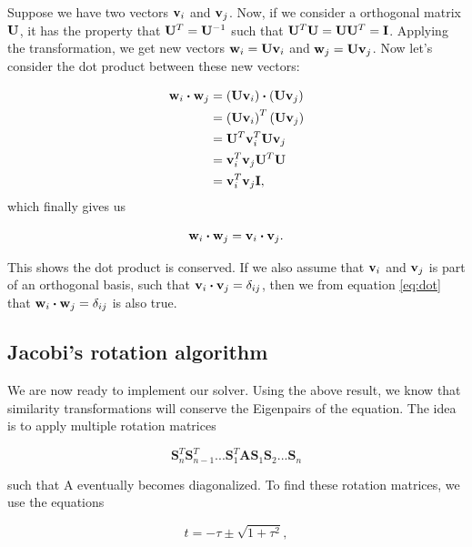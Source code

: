 \documentclass{emulateapj}
\begin{document}
Suppose we have two vectors $\bold{v}_i$ and $\bold{v}_j$. Now, if we consider a orthogonal matrix $\bold{U}$, it has the property that $\bold{U}^T = \bold{U}^{-1}$ such that $\bold{U}^T\bold{U} = \bold{U}\bold{U}^T = \bold{I}$. Applying the transformation, we get new vectors $\bold{w}_i = \bold{U}\bold{v}_i$ and $ \bold{w}_j = \bold{U}\bold{v}_j$.
Now let's consider the dot product between these new vectors:

\begin{align*}
	\bold{w}_i \boldsymbol{\cdot} \bold{w}_j &= \left(\bold{U}\bold{v}_i\right) \boldsymbol{\cdot} \left(\bold{U}\bold{v}_j\right) \\
	&= \left(\bold{U}\bold{v}_i\right)^T \left(\bold{U}\bold{v}_j\right) \\
	&= \bold{U}^T \bold{v}_i^T \bold{U}\bold{v}_j \\
	&= \bold{v}_i^T  \bold{v}_j \bold{U}^T \bold{U} \\
	&= \bold{v}_i^T  \bold{v}_j \bold{I},
\end{align*}
which finally gives us

\begin{equation} \label{eq:dot}
	\bold{w}_i \boldsymbol{\cdot} \bold{w}_j = \bold{v}_i \boldsymbol{\cdot} \bold{v}_j.
\end{equation}


This shows the dot product is conserved. If we also assume that $\bold{v}_i$ and $\bold{v}_j$ is part of an orthogonal basis, such that $\bold{v}_i \boldsymbol{\cdot} \bold{v}_j = \delta_{ij}$, then we from equation \ref{eq:dot} that $\bold{w}_i \boldsymbol{\cdot} \bold{w}_j = \delta_{ij}$ is also true.

\subsection{Jacobi's rotation algorithm}
We are now ready to implement our solver. Using the above result, we know that similarity transformations will conserve the Eigenpairs of the equation. The idea is to apply multiple rotation matrices

\[\mathbf{S}_n^T\mathbf{S}_{n-1}^T...\mathbf{S}_1^T\mathbf{A}\mathbf{S}_1\mathbf{S}_2...\mathbf{S}_n\]

such that A eventually becomes diagonalized. To find these rotation matrices, we use the equations

\begin{equation}
  t = -\tau \pm \sqrt{1+\tau^2},
\end{equation}
\end{document}
